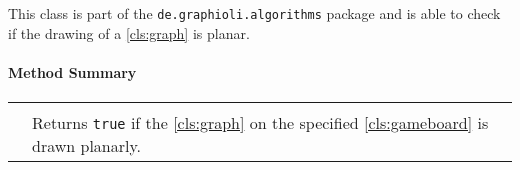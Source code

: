 This class is part of the \texttt{de.graphioli.algorithms} package and is able to check if the drawing of a \ref{cls:graph} is planar. \\

\centerdash

\paragraph*{Method Summary}
\paragraph*{}
\begin{longtable}{Lp{10cm}}
	\startmethodtable
	 \\
	& Returns \texttt{true} if the \ref{cls:graph} on the specified \ref{cls:gameboard} is drawn planarly. \\
	\hline
\end{longtable}

